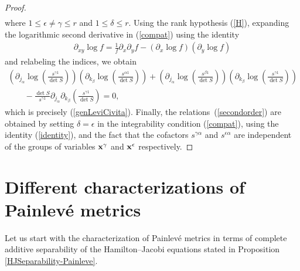 \documentclass[11pt]{article}
\numberwithin{equation}{section}
\newcommand{\jalpha}{j_{\alpha}}
\newcommand{\kbeta}{k_{\beta}}
\begin{document}
\begin{proof}
\begin{gather}
\end{gather}
where $1\leq \epsilon \neq \gamma \leq r$ and $1\leq \delta \leq r$. Using the rank hypothesis (\ref{H}), expanding the logarithmic second derivative in (\ref{compat}) using the identity
\begin{gather}\label{identity}
\partial_{xy}\log f = \frac{1}{f}\partial_{x}\partial_{y}f-(\partial_{x}\log f)(\partial_{y}\log f)
\end{gather}
and
 relabeling the indices, we obtain
\begin{gather*}
\left(\partial_{\jalpha}\log\left(\frac{s^{\gamma 1}}{\det S}\right)\right) \left(\partial_{\kbeta}\log\left(\frac{s^{\alpha 1}}{\det S}\right)\right)+\left(\partial_{\jalpha}\log\left(\frac{s^{\beta 1}}{\det S}\right)\right)\left(\partial_{\kbeta}\log\left(\frac{s^{\gamma 1}}{\det S}\right)\right)\\
\qquad{}-\frac{\det S}{s^{\gamma 1}}\partial_{\jalpha}\partial_{\kbeta}\left(\frac{s^{\gamma 1}}{\det S}\right)=0,
\end{gather*}
which is precisely (\ref{genLeviCivita}). Finally, the relations~(\ref{secondorder}) are obtained by setting $\delta = \epsilon$ in the integrability condition (\ref{compat}), using the identity (\ref{identity}), and the fact that the cofactors $s^{\gamma \alpha}$ and $s^{\epsilon \alpha}$ are independent of the groups of variables ${\bf x}^{\gamma}$ and ${\bf x}^{\epsilon}$ respectively.
\end{proof}

\section{Different characterizations of Painlev\'e metrics}\label{PainHJSection}

Let us start with the characterization of Painlev\'e metrics in terms of complete additive separability of the Hamilton--Jacobi equations stated in Proposition \ref{HJSeparability-Painleve}.
\end{document}
